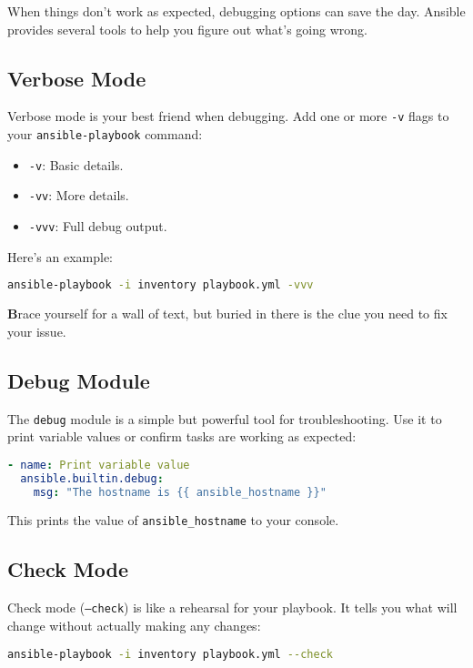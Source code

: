 When things don't work as expected, debugging options can save the day. Ansible provides several tools to help you figure out what's going wrong.

\subsection{Verbose Mode}

Verbose mode is your best friend when debugging. Add one or more \texttt{-v} flags to your \texttt{ansible-playbook} command:
\begin{itemize}
    \item \texttt{-v}: Basic details.
    \item \texttt{-vv}: More details.
    \item \texttt{-vvv}: Full debug output.
\end{itemize}

Here's an example:
\begin{lstlisting}[language=bash, caption=Running a Playbook with Verbose Output]
ansible-playbook -i inventory playbook.yml -vvv
\end{lstlisting}

\textbf{B}race yourself for a wall of text, but buried in there is the clue you need to fix your issue.

\subsection{Debug Module}

The \texttt{debug} module is a simple but powerful tool for troubleshooting. Use it to print variable values or confirm tasks are working as expected:
\begin{lstlisting}[language=yaml, caption=Using the Debug Module]
- name: Print variable value
  ansible.builtin.debug:
    msg: "The hostname is {{ ansible_hostname }}"
\end{lstlisting}

This prints the value of \texttt{ansible\_hostname} to your console.

\subsection{Check Mode}

Check mode (\texttt{--check}) is like a rehearsal for your playbook. It tells you what will change without actually making any changes:
\begin{lstlisting}[language=bash, caption=Running a Playbook in Check Mode]
ansible-playbook -i inventory playbook.yml --check
\end{lstlisting}

